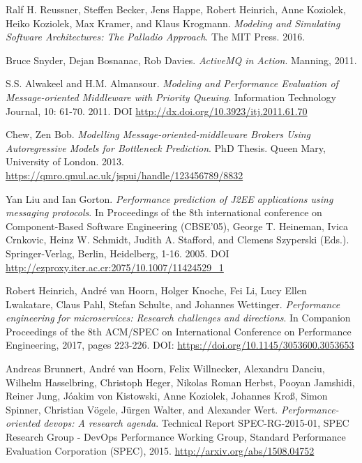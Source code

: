 \documentclass[11pt, twoside]{report}
\begin{document}

\begin{thebibliography}{9}

 Ralf H. Reussner, Steffen Becker, Jens Happe, Robert Heinrich, Anne Koziolek, Heiko Koziolek, Max Kramer, and Klaus Krogmann. \emph{Modeling and Simulating Software Architectures: The Palladio Approach}. The MIT Press. 2016.

 Bruce Snyder, Dejan Bosnanac, Rob Davies. \emph{ActiveMQ in Action}. Manning, 2011.

 S.S. Alwakeel and H.M. Almansour. \emph{Modeling and Performance Evaluation of Message-oriented Middleware with Priority Queuing}. Information Technology Journal, 10: 61-70. 2011. DOI \url{http://dx.doi.org/10.3923/itj.2011.61.70}

 Chew, Zen Bob. \emph{Modelling Message-oriented-middleware Brokers Using Autoregressive Models for Bottleneck Prediction}. PhD Thesis. Queen Mary, University of London. 2013. \url{https://qmro.qmul.ac.uk/jspui/handle/123456789/8832}

 Yan Liu and Ian Gorton. \emph{Performance prediction of J2EE applications using messaging protocols}. In Proceedings of the 8th international conference on Component-Based Software Engineering (CBSE'05), George T. Heineman, Ivica Crnkovic, Heinz W. Schmidt, Judith A. Stafford, and Clemens Szyperski (Eds.). Springer-Verlag, Berlin, Heidelberg, 1-16. 2005. DOI \url{http://ezproxy.itcr.ac.cr:2075/10.1007/11424529_1} 

 Robert Heinrich, André van Hoorn, Holger Knoche, Fei Li, Lucy Ellen Lwakatare, Claus Pahl, Stefan Schulte, and Johannes Wettinger. \emph{Performance engineering for microservices: Research challenges and directions}. In Companion Proceedings of the 8th ACM/SPEC on International Conference on Performance Engineering, 2017, pages 223-226. DOI: \url{https://doi.org/10.1145/3053600.3053653}

 Andreas Brunnert, André van Hoorn, Felix Willnecker, Alexandru Danciu, Wilhelm Hasselbring, Christoph Heger, Nikolas Roman Herbst, Pooyan Jamshidi, Reiner Jung, Jóakim von Kistowski, Anne Koziolek, Johannes Kroß, Simon Spinner, Christian Vögele, Jürgen Walter, and Alexander Wert. \emph{Performance-oriented devops: A research agenda}. Technical Report SPEC-RG-2015-01, SPEC Research Group - DevOps Performance Working Group, Standard Performance Evaluation Corporation (SPEC), 2015. \url{http://arxiv.org/abs/1508.04752}


\end{thebibliography}
\end{document}

